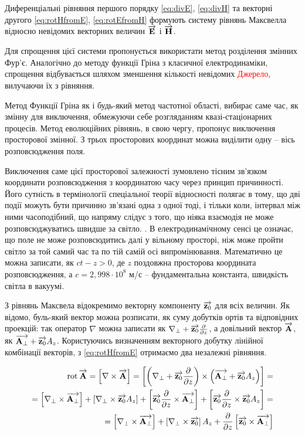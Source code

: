 Диференціальні рівняння першого порядку \eqref{eq:divE}, \eqref{eq:divH} та 
векторні другого \eqref{eq:rotHfromE}, \eqref{eq:rotEfromH} формують систему 
рівнянь Максвелла відносно невідомих векторних величин $ \overrightarrow{\mathbf E} $ і 
$ \overrightarrow{\mathbf H} $.

Для спрощення цієї системи пропонується використати метод розділення змінних
Фур'є. Аналогічно до методу функції Гріна з класичної електродинаміки, 
спрощення відбувається шляхом зменшення кількості невідомих 
\textcolor{red}{Джерело}, вилучаючи їх з рівняння. 

Метод Функції Гріна як і будь-який метод частотної області, вибирає саме час, 
як змінну для виключення, обмежуючи себе розгляданням квазі-стаціонарних 
процесів. Метод еволюційних рівнянь, в свою чергу, пропонує виключення 
просторової змінної. З трьох просторових координат можна виділити одну -- вісь 
розповсюдження поля. 

Виключення саме цієї просторової залежності зумовлено тісним зв'язком 
координати розповсюдження з координатою часу через принцип причинності. Його 
сутність в термінології спеціальної теорії відносності полягає в тому, що дві 
події можуть бути причинно зв'язані одна з одної тоді, і тільки коли, інтервал 
між ними часоподібний, що напряму слідує з того, що ніяка взаємодія не може 
розповсюджуватись швидше за світло. \cite[ст. 22]{LandauII}. В 
електродинамічному сенсі це означає, що поле не може розповсюдитись далі у 
вільному просторі, ніж може пройти світло за той самий час та по тій самій осі 
випромінювання. Математично це можна записати, як $ ct - z > 0 $, де $ z $
поздовжна просторова координата розповсюдження, а $ c = 2,998 \cdot 10^8 $ м/с 
-- фундаментальна константа, швидкість світла в вакуумі.

З рівнянь Максвела відокремимо векторну компоненту 
$ \overrightarrow{\mathbf z_0} $ для всіх величин. Як відомо, буль-який вектор можна розписати, 
як суму добутків ортів та відповідних проекцій: так оператор $ \nabla $ можна 
записати як $ \nabla_\perp + \overrightarrow{\mathbf z_0} \frac{\partial }{\partial z} $, а довільний вектор
$ \overrightarrow{\mathbf A} $, як $ \overrightarrow{\mathbf A_\perp} + \overrightarrow{\mathbf z_0} A_z $. Користуючись визначенням 
векторного добутку лінійної комбінації векторів, з \eqref{eq:rotHfromE} 
отримаємо два незалежні рівняння.

\textcolor{lightgray}{ \begin{equation*} \begin{aligned}
\mathop{\mathrm{rot}}\nolimits{ \overrightarrow{\mathbf A} } = \left[ \nabla \times \overrightarrow{\mathbf A} \right] = \left[ \left( \nabla_\perp + \overrightarrow{\mathbf z_0} \frac{\partial }{\partial z} \right) \times \left( \overrightarrow{\mathbf A_\perp} + \overrightarrow{\mathbf z_0} A_z \right) \right] = \\
= \left[ \nabla_\perp \times \overrightarrow{\mathbf A_\perp} \right] + 
\left[ \nabla_\perp \times \overrightarrow{\mathbf z_0} A_z \right] +
\left[ \overrightarrow{\mathbf z_0} \frac{\partial }{\partial z} \times \overrightarrow{\mathbf A_\perp} \right] +
\left[  \overrightarrow{\mathbf z_0} \frac{\partial }{\partial z}  \times  \overrightarrow{\mathbf z_0} A_z  \right] = \\
= \left[ \nabla_\perp \times \overrightarrow{\mathbf A_\perp} \right] + 
\left[ \nabla_\perp \times \overrightarrow{\mathbf z_0} \right] A_z +
\frac{\partial }{\partial z} \left[ \overrightarrow{\mathbf z_0} \times \overrightarrow{\mathbf A_\perp} \right]
\end{aligned} \end{equation*} }

